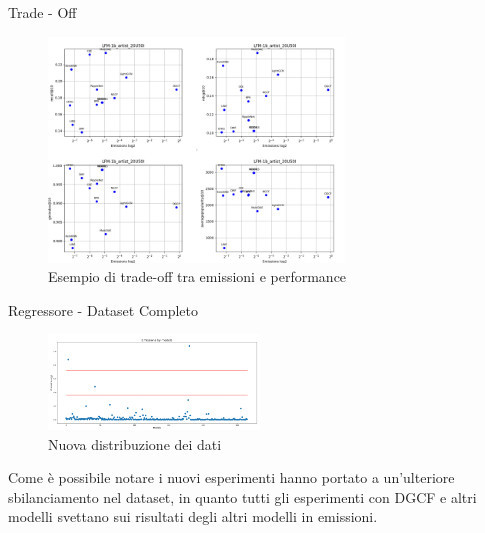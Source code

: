 \begin{frame}{Trade - Off}
    \begin{figure}[H]
    \centering
    \includegraphics[height=0.7\textheight, width=0.7\textwidth]{images/TradeOff.png}
    \caption{Esempio di trade-off tra emissioni e performance}
\end{figure}
\end{frame}




\begin{frame}{Regressore - Dataset Completo}
    \begin{figure}
    \centering
    \includegraphics[width=0.5\textwidth]{images/distribuzioneCompleta.png}
    \caption{Nuova distribuzione dei dati}
\end{figure}

Come è possibile notare i nuovi esperimenti hanno portato a un'ulteriore sbilanciamento nel dataset, in quanto tutti gli esperimenti con DGCF e altri modelli svettano sui risultati degli altri modelli in emissioni.

\end{frame}


